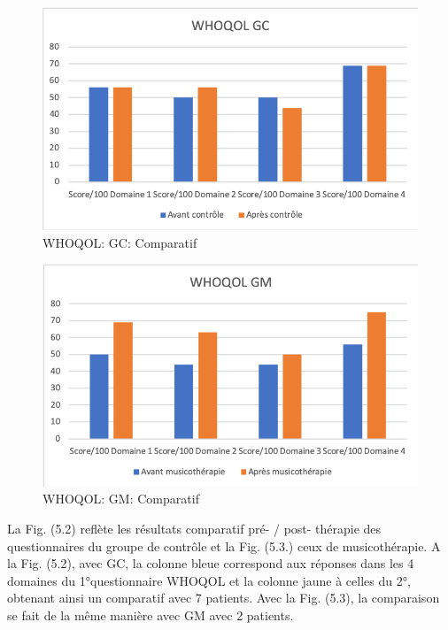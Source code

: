  
 
 
 
 
 
 
 
 \begin{figure} [th]
 	\centering
 	\includegraphics[width=0.7\linewidth]{images/Compcontrole.png}
 	\caption[WHOQOL:  GC: Comparatif entre les 2 questionnaires]{WHOQOL:  GC: Comparatif}
 	
 \end{figure}
 
 \begin{figure}[th]
 	\centering
 	\includegraphics[width=0.7\linewidth]{images/Compmusico.png}
 	\caption[WHOQOL: GM: Comparatif entre les 2 questionnaires]{ WHOQOL: GM: Comparatif}
 	
 \end{figure}
 La  Fig. (5.2) reflète les résultats comparatif pré- / post- thé\-ra\-pie des questionnaires
 du groupe de contrôle  et la  Fig. (5.3.) ceux de musicothérapie.
  A la Fig. (5.2), avec GC, la colonne bleue correspond aux réponses dans les 4 domaines du 
 1°questionnaire WHOQOL et la 
 colonne jaune à celles du 2°, obtenant ainsi un comparatif avec 7 patients.
 Avec la Fig. (5.3), la comparaison se fait de la même manière avec GM avec 2 patients.
  
